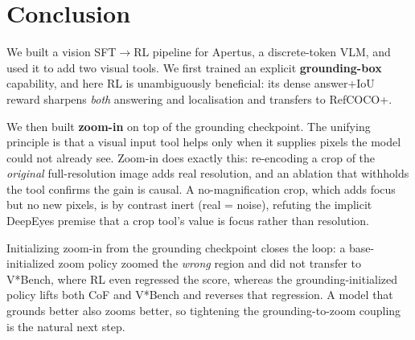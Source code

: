 \documentclass[10pt,twocolumn]{article}
\begin{document}
\section*{Conclusion}
We built a vision SFT$\rightarrow$RL pipeline for Apertus, a discrete-token VLM, and
used it to add two visual tools. We first trained an explicit \textbf{grounding-box}
capability, and here RL is unambiguously beneficial: its dense answer$+$IoU reward
sharpens \emph{both} answering and localisation and transfers to RefCOCO+.

We then built \textbf{zoom-in} on top of the grounding checkpoint. The unifying
principle is that a visual input tool helps only when it supplies pixels the model
could not already see. Zoom-in does exactly this: re-encoding a crop of the
\emph{original} full-resolution image adds real resolution, and an ablation that
withholds the tool confirms the gain is causal. A no-magnification crop, which adds
focus but no new pixels, is by contrast inert (real = noise), refuting the implicit
DeepEyes premise that a crop tool's value is focus rather than resolution.

Initializing zoom-in from the grounding checkpoint closes the loop: a
base-initialized zoom policy zoomed the \emph{wrong} region and did not transfer to
V*Bench, where RL even regressed the score, whereas the grounding-initialized policy
lifts both CoF and V*Bench and reverses that regression. A model that grounds better
also zooms better, so tightening the grounding-to-zoom coupling is the natural next
step.
\end{document}
